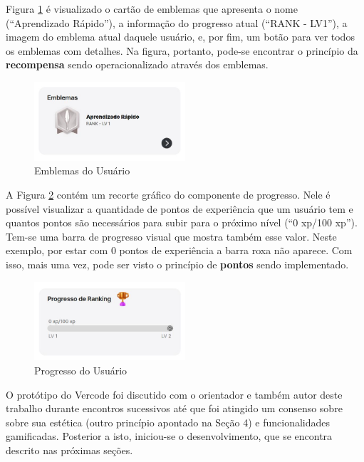 \documentclass[12pt]{article}
\begin{document}
Figura \ref{fig:cartao_emblemas} é visualizado o cartão de emblemas que apresenta o nome (“Aprendizado Rápido”), a informação do progresso atual (“RANK - LV1”), a imagem do emblema atual daquele usuário, e, por fim, um botão para ver todos os emblemas com detalhes. Na figura, portanto, pode-se encontrar o princípio da \textbf{recompensa} sendo operacionalizado através dos emblemas.

\begin{figure}[ht!]
\centering
\includegraphics[width=0.5\textwidth]{imagens/cartao_emblemas.jpg}
\caption{Emblemas do Usuário}
\label{fig:cartao_emblemas}
\end{figure}

A Figura \ref{fig:cartao_progresso} contém  um recorte gráfico do componente de progresso. Nele é possível visualizar a quantidade de pontos de experiência que um usuário tem e quantos pontos são necessários para subir para o próximo nível (“0 xp/100 xp”). Tem-se uma barra de progresso visual que mostra também esse valor. Neste exemplo, por estar com 0 pontos de experiência a barra roxa não aparece. Com isso, mais uma vez, pode ser visto o princípio de \textbf{pontos} sendo implementado. 

\begin{figure}[ht!]
\centering
\includegraphics[width=0.5\textwidth]{imagens/progresso.jpg}
\caption{Progresso do Usuário}
\label{fig:cartao_progresso}
\end{figure}

O protótipo do Vercode foi discutido com o orientador e também autor deste trabalho durante encontros sucessivos até que foi atingido um consenso sobre sobre sua estética (outro princípio apontado na Seção 4) e funcionalidades gamificadas. Posterior a isto, iniciou-se o desenvolvimento, que se encontra descrito nas próximas seções.
\end{document}
